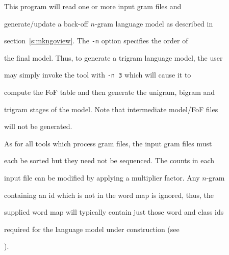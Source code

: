 %




%




%





\newpage



















This program will read one or more input gram files and


generate/update a back-off $n$-gram language model as described in


section~\ref{s:mkngoview}. The \texttt{-n} option specifies the order of


the final model. Thus, to generate a trigram language model, the user


may simply invoke the tool with \texttt{-n 3} which will cause it to


compute the FoF table and then generate the unigram, bigram and


trigram stages of the model. Note that intermediate model/FoF files


will not be generated.





As for all tools which process gram files, the input gram files must


each be sorted but they need not be sequenced. The counts in each


input file can be modified by applying a multiplier factor. Any $n$-gram


containing an id which is not in the word map is ignored, thus, the


supplied word map will typically contain just those word and class ids


required for the language model under construction (see


).





